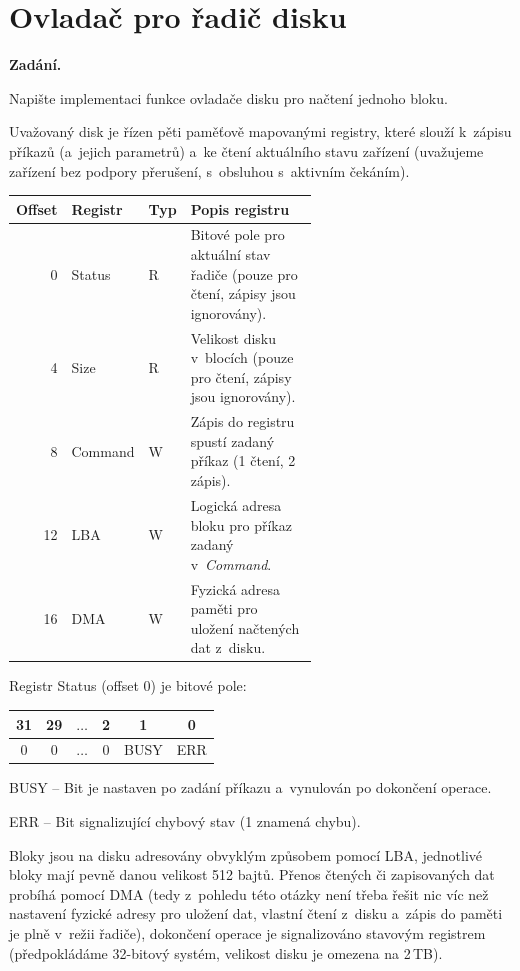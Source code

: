 \section{Ovladač pro řadič disku}

\noindent\textbf{Zadání.}\par
Napište implementaci funkce ovladače disku pro načtení jednoho bloku.

Uvažovaný disk je řízen pěti paměťově mapovanými registry, které slouží k~zápisu příkazů
(a~jejich parametrů) a~ke čtení aktuálního stavu zařízení (uvažujeme zařízení bez podpory
přerušení, s~obsluhou s~aktivním čekáním).

\begin{center}
\begin{tabular}{rllp{0.6\linewidth}}
\toprule
Offset & Registr & Typ & Popis registru \\
\midrule
0  & Status  & R & Bitové pole pro aktuální stav řadiče (pouze pro čtení, zápisy jsou ignorovány). \\
4  & Size    & R & Velikost disku v~blocích (pouze pro čtení, zápisy jsou ignorovány). \\
8  & Command & W & Zápis do registru spustí zadaný příkaz (1 čtení, 2 zápis). \\
12 & LBA     & W & Logická adresa bloku pro příkaz zadaný v~\textit{Command}. \\
16 & DMA     & W & Fyzická adresa paměti pro uložení načtených dat z~disku. \\
\bottomrule
\end{tabular}
\end{center}

\noindent Registr Status (offset 0) je bitové pole:
\begin{center}
\begin{tabular}{|c|c|c|c|c|c|}
\hline
31 & 29 & $\dots$ & 2 & 1 & 0 \\
\hline
0 & 0 & $\dots$ & 0 & BUSY & ERR \\
\hline
\end{tabular}
\end{center}
\noindent BUSY -- Bit je nastaven po zadání příkazu a~vynulován po dokončení operace.\par
\noindent ERR -- Bit signalizující chybový stav (1 znamená chybu).

\medskip
Bloky jsou na disku adresovány obvyklým způsobem pomocí LBA, jednotlivé bloky mají pevně
danou velikost 512 bajtů. Přenos čtených či zapisovaných dat probíhá pomocí DMA (tedy
z~pohledu této otázky není třeba řešit nic víc než nastavení fyzické adresy pro uložení
dat, vlastní čtení z~disku a~zápis do paměti je plně v~režii řadiče), dokončení operace je
signalizováno stavovým registrem (předpokládáme 32-bitový systém, velikost disku je
omezena na 2\,TB).

